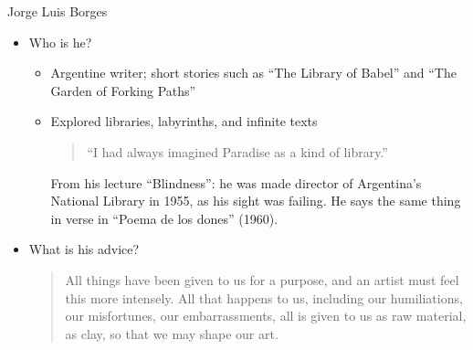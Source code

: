 \documentclass[aspectratio=169]{beamer}
\begin{document}
\begin{frame}{Jorge Luis Borges}
  \begin{itemize}
  \item Who is he?
    \begin{itemize}
    \item Argentine writer; short stories such as ``The Library of Babel'' and ``The Garden of Forking Paths''
    \item Explored libraries, labyrinths, and infinite texts
     \begin{quote}
      ``I had always imagined Paradise as a kind of library.''
      \hfill \citep{Borges:SevenNights}
    \end{quote}
    From his lecture ``Blindness'': he was made director of Argentina's
    National Library in 1955, as his sight was failing.  He says the same
    thing in verse in ``Poema de los dones'' (1960).
  \end{itemize}
  \item What is his advice?
    \begin{quote}
      All things have been given to us for a purpose, and an artist must feel this more intensely. All that happens to us, including our humiliations, our misfortunes, our embarrassments, all is given to us as raw material, as clay, so that we may shape our art.\hfill \citep{Borges:Alifano:1984}
    \end{quote}
 \end{itemize}
\end{frame}

\end{document}
